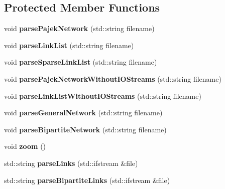 \subsection*{Protected Member Functions}
\begin{DoxyCompactItemize}
\item 
\mbox{\label{classNetwork_a0ac4e9ce5d7fc30ded0b85792e3b0da5}} 
void {\bfseries parse\+Pajek\+Network} (std\+::string filename)
\item 
\mbox{\label{classNetwork_aa0dcaf8e7724f3f18bc163e6024faa96}} 
void {\bfseries parse\+Link\+List} (std\+::string filename)
\item 
\mbox{\label{classNetwork_ae503c3447d73184ca5a29bc93be66d31}} 
void {\bfseries parse\+Sparse\+Link\+List} (std\+::string filename)
\item 
\mbox{\label{classNetwork_a4eb401b096fb37813afb56c150301be2}} 
void {\bfseries parse\+Pajek\+Network\+Without\+I\+O\+Streams} (std\+::string filename)
\item 
\mbox{\label{classNetwork_a56904b5b0171dc6d61be8900b2e7bcbd}} 
void {\bfseries parse\+Link\+List\+Without\+I\+O\+Streams} (std\+::string filename)
\item 
\mbox{\label{classNetwork_a641c8ebdfeb4f1db5102624fb46cd6b1}} 
void {\bfseries parse\+General\+Network} (std\+::string filename)
\item 
\mbox{\label{classNetwork_a47aeb2ec640e9d27dcff357711a704ee}} 
void {\bfseries parse\+Bipartite\+Network} (std\+::string filename)
\item 
\mbox{\label{classNetwork_aeedd55311935f1f4b7f7b0c523b46a6b}} 
void {\bfseries zoom} ()
\item 
\mbox{\label{classNetwork_a8cec3dfb346c1e29a48704ec32dedf9c}} 
std\+::string {\bfseries parse\+Links} (std\+::ifstream \&file)
\item 
\mbox{\label{classNetwork_a00c9f0be21dfae4626b7e0f36ae30618}} 
std\+::string {\bfseries parse\+Bipartite\+Links} (std\+::ifstream \&file)

\end{DoxyCompactItemize}
